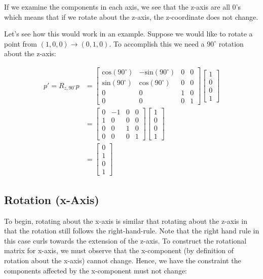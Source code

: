 \documentclass[12pt,letterpaper]{article}
\begin{document}
If we examine the components in each axis, we see that the z-axis are all 0's which means that if we rotate about the z-axis, the z-coordinate does not change.

\newpage

Let's see how this would work in an example. Suppose we would like to rotate a point from $(1, 0, 0) \rightarrow (0, 1, 0)$. To accomplish this we need a $90^{\circ}$ rotation about the z-axis:

\begin{equation}
    \begin{aligned}
    p' = R_{z, 90^{\circ}}p
    &= \begin{bmatrix}
        \text{cos}(90^{\circ}) & -\text{sin}(90^{\circ}) & 0 & 0 \\
        \text{sin}(90^{\circ}) &  \text{cos}(90^{\circ}) & 0 & 0 \\
        0 & 0 & 1 & 0 \\
        0 & 0 & 0 & 1
    \end{bmatrix}
     \begin{bmatrix}
        1 \\
        0 \\
        0 \\
        1
    \end{bmatrix} \\
    &= \begin{bmatrix}
        0 & -1 & 0 & 0 \\
        1 & 0  & 0 & 0 \\
        0 & 0  & 1 & 0 \\
        0 & 0  & 0 & 1
    \end{bmatrix}
     \begin{bmatrix}
        1 \\
        0 \\
        0 \\
        1
    \end{bmatrix} \\
    &= \begin{bmatrix}
        0 \\
        1 \\
        0 \\
        1
    \end{bmatrix}
    \end{aligned}
\end{equation}

\subsection{Rotation (x-Axis)}
To begin, rotating about the x-axis is similar that rotating about the z-axis in that the rotation still follows the right-hand-rule. Note that the right hand rule in this case curls towards the extension of the z-axis. To construct the rotational matrix for x-axis, we must observe that the x-component (by definition of rotation about the x-axis) cannot change. Hence, we have the constraint the components affected by the x-component must not change:
\end{document}
